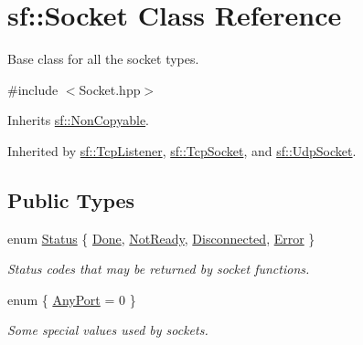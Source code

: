 \hypertarget{classsf_1_1_socket}{\section{sf\+:\+:Socket Class Reference}
\label{classsf_1_1_socket}
}


Base class for all the socket types.  




{\ttfamily \#include $<$Socket.\+hpp$>$}



Inherits \hyperlink{classsf_1_1_non_copyable}{sf\+::\+Non\+Copyable}.



Inherited by \hyperlink{classsf_1_1_tcp_listener}{sf\+::\+Tcp\+Listener}, \hyperlink{classsf_1_1_tcp_socket}{sf\+::\+Tcp\+Socket}, and \hyperlink{classsf_1_1_udp_socket}{sf\+::\+Udp\+Socket}.

\subsection*{Public Types}
\begin{DoxyCompactItemize}
\item 
enum \hyperlink{classsf_1_1_socket_a51bf0fd51057b98a10fbb866246176dc}{Status} \{ \hyperlink{classsf_1_1_socket_a51bf0fd51057b98a10fbb866246176dca1de3a85bc56d3ae85b3d0f3cfd04ae90}{Done}, 
\hyperlink{classsf_1_1_socket_a51bf0fd51057b98a10fbb866246176dca8554848daae98f996e131bdeed076c09}{Not\+Ready}, 
\hyperlink{classsf_1_1_socket_a51bf0fd51057b98a10fbb866246176dcab215141f756acdc23c67fad149710eb1}{Disconnected}, 
\hyperlink{classsf_1_1_socket_a51bf0fd51057b98a10fbb866246176dca1dc9854433a28c22e192721179a2df5d}{Error}
 \}
\begin{DoxyCompactList}\small\item\em Status codes that may be returned by socket functions. \end{DoxyCompactList}\item 
enum \{ \hyperlink{classsf_1_1_socket_a5deb2c955fd347259c3a20d27b2481aaa5a3c30fd128895403afc11076f461b19}{Any\+Port} = 0
 \}
\begin{DoxyCompactList}\small\item\em Some special values used by sockets. \end{DoxyCompactList}\end{DoxyCompactItemize}
